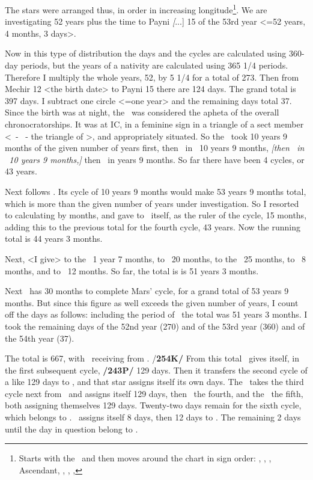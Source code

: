 The stars were arranged thus, in order in increasing longitude\footnote{Starts with the \Moon\, and then moves around the chart in sign order: \Moon, \Venus, \Jupiter, Ascendant, \Saturn, \Mars, \Sun, \Mercury}. We are investigating 52 years plus the time to Payni \textsl[...] 15 of the 53rd year <=52 years, 4 months, 3 days>. 

Now in this type of distribution the days and the cycles are calculated using 360-day periods, but the years of a nativity are calculated using 365 1/4 periods. Therefore I multiply the whole years, 52, by 5 1/4 for a total of 273. Then from Mechir 12 <the birth date> to Payni 15 there are 124 days. The grand total is 397 days. I subtract one circle <=one year> and the remaining days total 37. Since the birth was at night, the \Moon\, was considered the apheta of the overall chronocratorships. It was at IC, in a feminine sign in a triangle of a sect member <\Pisces\, - \Cancer\, - \Scorpio  the triangle of \Venus>, and appropriately situated. So the \Moon\, took 10 years 9 months of the given number of years first, then \Venus\, in \Aries\, 10 years 9 months, \textsl{[then \Jupiter\, in \Libra\, 10 years 9 months,]} then \Saturn\, in  years 9 months. So far there have been 4 cycles, or 43 years.

Next follows \Mars. Its cycle of 10 years 9 months would make 53 years 9 months total, which is more than the given number of years under investigation. So I resorted to calculating by months, and gave to \Mars\, itself, as the ruler of the cycle, 15 months, adding this to the previous total for the fourth cycle, 43 years. Now the running total is 44 years 3 months. 

Next, <I give> to the \Sun\, 1 year 7 months, to \Mercury\, 20 months, to the \Moon\, 25 months, to \Venus\, 8 months, and to \Jupiter\, 12 months. So far, the total is is 51 years 3 months. 

Next \Saturn\, has 30 months to complete Mars’ cycle, for a grand total of 53 years 9 months. But since this figure as well exceeds the given number of years, I count off the days as follows: including the period of \Jupiter\, the total was 51 years 3 months. I took the remaining days of the 52nd year (270) and of the 53rd year (360) and of the 54th year (37). 

The total is 667, with \Saturn\, receiving from \Mars. /\textbf{254K/} From this total \Saturn\, gives itself, in the first subsequent cycle, \textbf{/243P/} 129 days. Then it transfers the second cycle of a like 129 days to \Mars, and that star assigns itself its own days. The \Sun\, takes the third cycle next from \Saturn\, and assigns itself 129 days, then \Mercury\, the fourth, and the \Moon\, the fifth, both assigning themselves 129 days. Twenty-two days remain for the sixth cycle, which belongs to \Venus. \Venus\, assigns itself 8 days, then 12 days to \Jupiter. The remaining 2 days until the day in question belong to \Saturn. 

